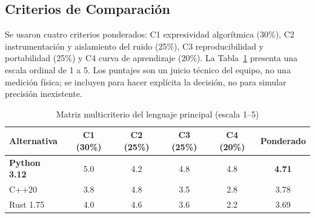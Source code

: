 \subsection{Criterios de Comparación}
Se usaron cuatro criterios ponderados: C1 expresividad algorítmica (30\%), C2 instrumentación y aislamiento del ruido (25\%), C3 reproducibilidad y portabilidad (25\%) y C4 curva de aprendizaje (20\%). La Tabla~\ref{tab:matriz_multicriterio} presenta una escala ordinal de 1 a 5. Los puntajes son un juicio técnico del equipo, no una medición física; se incluyen para hacer explícita la decisión, no para simular precisión inexistente.

\begin{table}[H]
    \centering
    \fontsize{9.5}{11.5}\selectfont
    \renewcommand{\arraystretch}{1.15}
    \caption{Matriz multicriterio del lenguaje principal (escala 1--5)}
    \label{tab:matriz_multicriterio}
    \begin{tabularx}{\textwidth}{@{}>{\raggedright\arraybackslash}Xccccc@{}}
        \toprule
        \textbf{Alternativa} & \textbf{C1 (30\%)} & \textbf{C2 (25\%)} & \textbf{C3 (25\%)} & \textbf{C4 (20\%)} & \textbf{Ponderado} \\
        \midrule
        \textbf{Python 3.12} & 5.0 & 4.2 & 4.8 & 4.8 & \textbf{4.71} \\
        C++20 & 3.8 & 4.8 & 3.5 & 2.8 & 3.78 \\
        Rust 1.75 & 4.0 & 4.6 & 3.6 & 2.2 & 3.69 \\
        \bottomrule
    \end{tabularx}
\end{table}


